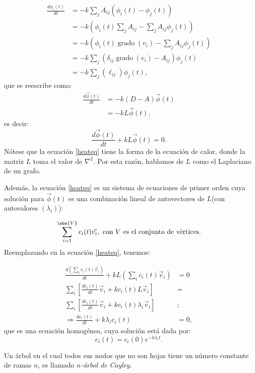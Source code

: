 \[
\begin{aligned}
\frac{d \phi_{i}(t)}{d t} &=-k \sum_{j} A_{i j}\left(\phi_{i}(t)-\phi_{j}(t)\right) \\
&=-k\left(\phi_{i}(t) \sum_{j} A_{i j}-\sum_{j} A_{i j} \phi_{j}(t)\right) \\
&=-k\left(\phi_{i}(t) \operatorname{grado}\left(v_{i}\right)-\sum_{j} A_{i j} \phi_{j}(t)\right) \\
&=-k \sum_{j}\left(\delta_{i j} \operatorname{grado}\left(v_{i}\right)-A_{i j}\right) \phi_{j}(t) \\
&=-k \sum_{j}\left(\ell_{i j}\right) \phi_{j}(t),
\end{aligned}
\]
que se reescribe como:
\[
\begin{aligned}
\frac{d \vec{\phi}(t)}{d t} &=-k(D-A) \vec{\phi}(t) \\
&=-k L \vec{\phi}(t),
\end{aligned}
\]
es decir:
\begin{equation}\label{heateq}
\frac{d \vec{\phi}(t)}{d t}+k L \vec{\phi}(t)=0.
\end{equation}
Nótese que la ecuación \ref{heateq} tiene la forma de la ecuación de calor, donde la matriz $L$ toma el valor de $\nabla^2$. Por esta razón, hablamos de $L$ como el Laplaciano de un grafo.

Además, la ecuación \ref{heateq} es un sistema de ecuaciones de primer orden cuya solución para $\vec{\phi}(t)$ es una combinación lineal de autovectores de $L$(con autovalores $(\lambda_i)$):

$$\sum_{i=1}^{\abs{V}}c_i(t)\vec{v_i},\text{ con $V$ es el conjunto de vértices.}$$
Reemplazando en la ecuación \ref{heateq}, tenemos:

\begin{align*}
\frac{d\left(\sum_{i} c_{i}(t) \vec{v}_{i}\right)}{d t}+k L\left(\sum_{i} c_{i}(t) \vec{v}_{i}\right) &=0 \\
\sum_{i}\left[\frac{d c_{i}(t)}{d t} \vec{v}_{i}+k c_{i}(t) L \vec{v}_{i}\right] &=\\
\sum_{i}\left[\frac{d c_{i}(t)}{d t} \vec{v}_{i}+k c_{i}(t) \lambda_{i} \vec{v}_{i}\right] &;\\
\Rightarrow \frac{d c_{i}(t)}{d t}+k \lambda_{i} c_{i}(t) &=0,
\end{align*}
que es una ecuación homogénea, cuya solución está dada por:
$$c_i(t)=c_i(0)e^{-k\lambda_it}.$$
\begin{definition}
	Un árbol en el cual todos sus nodos que no son hojas tiene un número constante de ramas $n$, es llamado \textit{$n$-árbol de Cayley.}
\end{definition}

